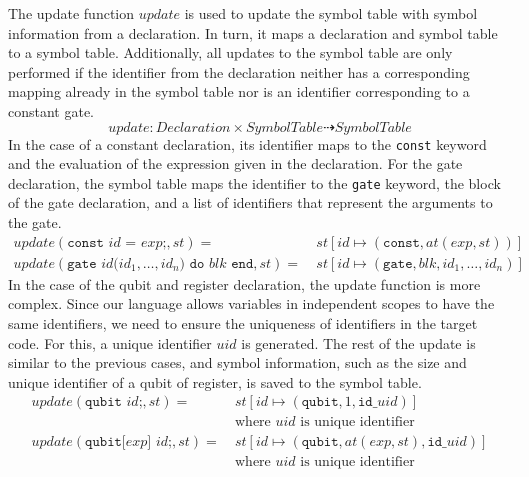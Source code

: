 The update function $update$ is used to update the symbol table with symbol information from a declaration. In turn, it maps a declaration and symbol table to a symbol table. Additionally, all updates to the symbol table are only performed if the identifier from the declaration neither has a corresponding mapping already in the symbol table nor is an identifier corresponding to a constant gate.
\begin{equation*}
    update :  Declaration \times SymbolTable \dashrightarrow SymbolTable
\end{equation*}
In the case of a constant declaration, its identifier maps to the \texttt{const} keyword and the evaluation of the expression given in the declaration. For the gate declaration, the symbol table maps the identifier to the \texttt{gate} keyword, the block of the gate declaration, and a list of identifiers that represent the arguments to the gate.
\begin{align*}
    update(\texttt{const } id \texttt{ = } exp \texttt{;}, st) = \ & st[id \mapsto (\texttt{const}, at(exp, st))]\\
    update(\texttt{gate } id \texttt{(}id_1, \dots, id_n\texttt{)} \texttt{ do } blk \texttt{ end}, st) = \ & st[id \mapsto (\texttt{gate}, blk, id_1, \dots, id_n)]
\end{align*}
In the case of the qubit and register declaration, the update function is more complex. Since our language allows variables in independent scopes to have the same identifiers, we need to ensure the uniqueness of identifiers in the target code. For this, a unique identifier $uid$ is generated. The rest of the update is similar to the previous cases, and symbol information, such as the size and unique identifier of a qubit of register, is saved to the symbol table.
\begin{align*}
    update(\texttt{qubit } id\texttt{;}, st) = \ & st[id \mapsto (\texttt{qubit}, 1, \texttt{id\_}uid)]\\
                                                 & \text{where } uid \text{ is unique identifier}\\
    update(\texttt{qubit[} exp \texttt{] } id\texttt{;}, st) = \ & st[id \mapsto (\texttt{qubit}, at(exp, st), \texttt{id\_}uid)]\\
                                                 & \text{where } uid \text{ is unique identifier}
\end{align*}


